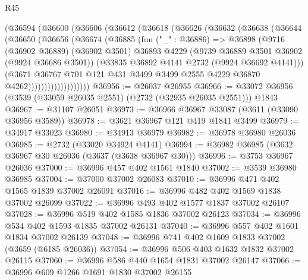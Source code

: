 \begin{lexlean}{R45}
\begin{coremodule}
            (@36594
              (@36600
                (@36606
                  (@36612
                    (@36618
                      (@36626
                        (@36632
                          (@36638
                            (@36644
                              (@36650
                                (@36656
                                  (@36674
                                    (@36885
                                      (fun ("_" : @36886) =>
                                      @36898
                                        (@9716
                                          (@36902 @36889)
                                          (@36902 @3501)
                                          @36893
                                          @4229
                                          (@9739 @36889 @3501 @36902 (@9924 @36686 @3501))
                                          (@33835 @36892 @4141 @2732 (@9924 @36692 @4141)))
                                        (@3671
                                          @36767
                                          @701
                                          @121
                                          @431
                                          @3499
                                          @3499
                                          @2555
                                          @4229
                                          @36870
                                          @4262)))))))))))))))))))
@36956 := @26037 @26955
@36966 := @33072 @36956 (@3539 (@33059 @26035 @2551) (@2732 (@32935 @26035 @2551))) @1843
@36967 := @31107 @26051
@36973 := @36966 @36967 @33087 (@3611 (@33090 @36956 @3589))
@36978 := @3621 @36967 @121 @419 @1841 @3499
@36979 := @34917 @33023
@36980 := @34913 @36979
@36982 := @36978 @36980 @26036
@36985 := @2732 (@33020 @34924 @4141)
@36994 := @36982 @36985 (@3632 @36967 @30 @26036 (@3637 (@3638 @36967 @30)))
@36996 := @3753 @36967 @26036
@37000 := @36996 @457 @402 @1561 @1840
@37002 := @3539 @36980 @36985
@37004 := @37000 @37002 @26083
@37010 := @36996 @471 @402 @1565 @1839 @37002 @26091
@37016 := @36996 @482 @402 @1569 @1838 @37002 @26099
@37022 := @36996 @493 @402 @1577 @1837 @37002 @26107
@37028 := @36996 @519 @402 @1585 @1836 @37002 @26123
@37034 := @36996 @534 @402 @1593 @1835 @37002 @26131
@37040 := @36996 @557 @402 @1601 @1834 @37002 @26139
@37048 := @36996 @741 @402 @1609 @1833 @37002 (@3659 (@6185 @26036))
@37054 := @36996 @506 @403 @1632 @1832 @37002 @26115
@37060 := @36996 @586 @440 @1654 @1831 @37002 @26147
@37066 := @36996 @609 @1266 @1691 @1830 @37002 @26155

\end{coremodule}
\end{lexlean}
